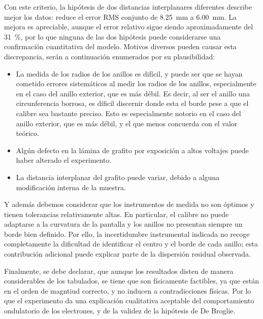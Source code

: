 \documentclass[a4paper,11pt]{article}
\begin{document}
Con este criterio, la hipótesis de dos distancias interplanares diferentes
describe mejor los datos: reduce el error RMS conjunto de
\SI{8.25}{mm} a \SI{6.00}{mm}. La mejora es apreciable, aunque el error
relativo sigue siendo aproximadamente del \SI{31}{\percent}, por lo que
ninguna de las dos hipótesis puede considerarse una confirmación cuantitativa
del modelo. 
Motivos diversos pueden causar esta discrepancia, serán a continuación enumerados por su plausibilidad:
\begin{itemize}
    \item La medida de los radios de los anillos es difícil, y puede ser
    que se hayan cometido errores sistemáticos al medir los radios de los
    anillos, especialmente en el caso del anillo exterior, que es más débil. 
    Es decir, al ser el anillo una circunferencia borrosa, es díficil discernir donde esta el borde pese a que el calibre sea bastante preciso. Esto es especialmente notorio
    en el caso del anillo exterior, que es más débil, y el que menos concuerda con el valor teórico.
    \item Algún defecto en la lámina de grafito por exposición a altos voltajes puede haber alterado el experimento.
    \item La distancia interplanar del grafito puede variar, debido a alguna modificación interna de la muestra.
\end{itemize}

Y además debemos considerar que los instrumentos de medida no son óptimos y
tienen tolerancias relativamente altas. En particular, el calibre no puede
adaptarse a la curvatura de la pantalla y los anillos no presentan siempre
un borde bien definido. Por ello, la incertidumbre instrumental indicada no
recoge completamente la dificultad de identificar el centro y el borde de
cada anillo; esta contribución adicional puede explicar parte de la
dispersión residual observada.


Finalmente, se debe declarar, que aunque los resultados disten de manera considerables de los tabulados, se tiene que son físicamente factibles, ya
que están en el orden de magntiud correcto, y no inducen a contradicciones físicas. Por lo que el experimento da una 
explicación cualitativa aceptable del comportamiento ondulatorio de los electrones, y de la validez de la hipótesis de De Broglie.
\end{document}
